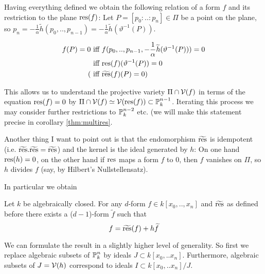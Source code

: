 Having everything defined we obtain the following relation of a form $f$ and its restriction to the plane ${\operatorname{res}}(f)$: Let $P = [p_0:..:p_n] \in \Pi$ be a point on the plane, so $p_n = -\frac 1\alpha \widetilde h(p_0,..,p_{n-1}) = -\frac 1\alpha \widetilde h(\vartheta^{-1}(P))$.

\begin{align}
f(P) = 0
&\text{ iff } f(p_0,..,p_{n-1},-\frac 1\alpha \widetilde h(\vartheta^{-1}(P))) = 0
\\
&\text { iff } {\operatorname{res}}(f)(\vartheta^{-1}(P)) = 0
\\
(&\text{ iff } \widetilde{{\operatorname{res}}}(f)(P) = 0)
\end{align}

This allows us to understand the projective variety $\Pi \cap \operatorname{\mathcal V}(f)$ in terms of the equation ${\operatorname{res}}(f) = 0$ by $\Pi \cap \operatorname{\mathcal V}(f) \simeq \operatorname{\mathcal V}({\operatorname{res}}(f)) \subset \operatorname{\mathbb P}^{n-1}_k$.
Iterating this process we may consider further restrictions to $\operatorname{\mathbb P}^{n-2}_k$ etc. (we will make this statement precise in corollary \ref{thm:multires}.

Another thing I want to point out is that the endomorphism $\widetilde{{\operatorname{res}}}$ is idempotent (i.e. $\widetilde{{\operatorname{res}}}.\widetilde{{\operatorname{res}}} = \widetilde{{\operatorname{res}}}$) and the kernel is the ideal generated by $h$: On one hand ${\operatorname{res}}(h) = 0$, on the other hand if ${\operatorname{res}}$ maps a form $f$ to $0$, then $f$ vanishes on $\Pi$, so $h$ divides $f$ (say, by Hilbert's Nullstellensatz).

In particular we obtain
\begin{proposition}
Let $k$ be algebraically closed.
For any $d$-form $f \in k[x_0,..,x_n]$ and $\widetilde{{\operatorname{res}}}$ as defined before there exists a ($d-1$)-form $\widetilde f$ such that
\begin{equation}
f = \widetilde{{\operatorname{res}}}(f) +  h\widetilde f
\end{equation}
\end{proposition}

\begin{todo}
\item We can formulate the result in a slightly higher level of generality. So first we replace algebraic subsets of $\operatorname{\mathbb P}^n_k$ by ideals $J \subset k[x_0,..x_n]$.
Furthermore, algebraic subsets of $J = \operatorname{\mathcal V}(h)$ correspond to ideals $I \subset k[x_0,..x_n]/J$.
\end{todo}

